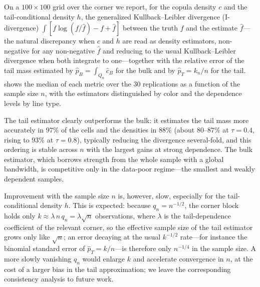 \documentclass[12pt, headinclude=true]{scrartcl}
\begin{document}
On a $100\times100$ grid over the corner we report, for the copula density $c$ and the tail-conditional density $h$, the generalized Kullback--Leibler divergence (I-divergence) $\int[f\log(f/\hat f)-f+\hat f]$ between the truth $f$ and the estimate $\hat f$---the natural discrepancy when $c$ and $h$ are read as density estimators, non-negative for any non-negative $\hat f$ and reducing to the usual Kullback--Leibler divergence when both integrate to one---together with the relative error of the tail mass estimated by $\hat p_B=\int_{Q_n}\hat c_B$ for the bulk and by $\hat p_T=k_n/n$ for the tail.
 shows the median of each metric over the $30$ replications as a function of the sample size $n$, with the estimators distinguished by color and the dependence levels by line type.

The tail estimator clearly outperforms the bulk: it estimates the tail mass more accurately in $97\%$ of the cells and the densities in $88\%$ (about $80$--$87\%$ at $\tau=0.4$, rising to $93\%$ at $\tau=0.8$), typically reducing the divergence several-fold, and this ordering is stable across $n$ with the largest gains at strong dependence.
The bulk estimator, which borrows strength from the whole sample with a global bandwidth, is competitive only in the data-poor regime---the smallest and weakly dependent samples.

Improvement with the sample size $n$ is, however, slow, especially for the tail-conditional density $h$.
This is expected: because $q_n=n^{-1/2}$, the corner block holds only $k\approx\lambda\,n\,q_n=\lambda\sqrt{n}$ observations, where $\lambda$ is the tail-dependence coefficient of the relevant corner, so the effective sample size of the tail estimator grows only like $\sqrt n$; an error decaying at the usual $k^{-1/2}$ rate---for instance the binomial standard error of $\hat p_T=k/n$---is therefore only $n^{-1/4}$ in the sample size.
A more slowly vanishing $q_n$ would enlarge $k$ and accelerate convergence in $n$, at the cost of a larger bias in the tail approximation; we leave the corresponding consistency analysis to future work.

\end{document}

